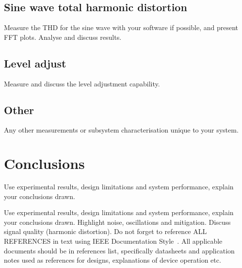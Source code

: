 \documentclass[11pt,a4paper]{article}
\begin{document}
\subsection{Sine wave total harmonic distortion}

Measure the THD for the sine wave with your software if possible, and present FFT plots. Analyse and discuss results.

\subsection{Level adjust}

Measure and discuss the level adjustment capability.

\subsection{Other}

Any other measurements or subsystem characterisation unique to your system.


\newpage
\section{Conclusions}
Use experimental results, design limitations and system performance, explain your conclusions drawn.

Use experimental results, design limitations and system performance, explain your conclusions drawn.
Highlight noise, oscillations and mitigation. Discuss signal quality (harmonic distortion).
Do not forget to reference ALL REFERENCES in text using IEEE Documentation Style~\cite{IEEErefguide:2023}.
All applicable documents should be in references list, specifically datasheets and application notes \cite{lm555:2014} used as references for designs, explanations of device operation etc.



\clearpage %




\end{document}
